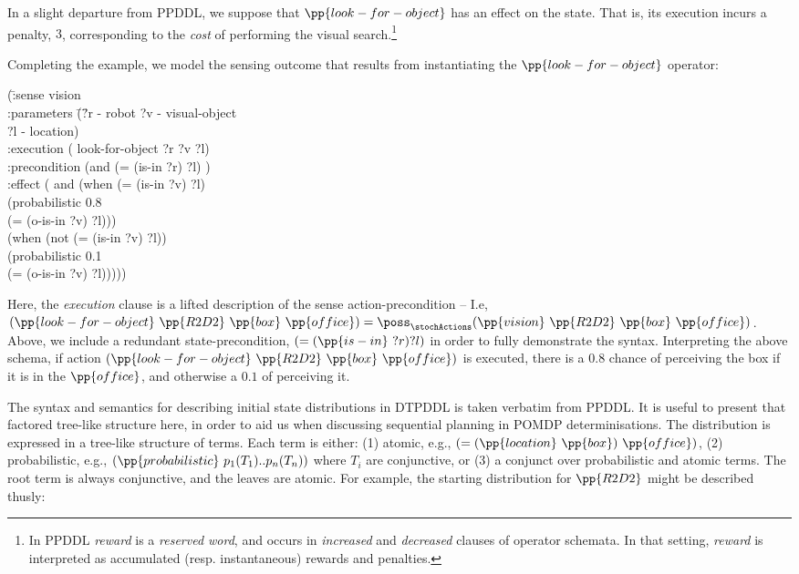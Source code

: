 \documentclass[letterpaper]{article}
\begin{document}
\noindent In a slight departure from PPDDL, we suppose that
$\pp{look-for-object}$ has an effect on the state. That is, its
execution incurs a penalty, $3$, corresponding to the {\em cost} of
performing the visual search.\footnote{In PPDDL {\em reward} is a {\em
reserved word}, and occurs in {\em increased} and {\em decreased}
clauses of operator schemata. In that setting, {\em reward} is
interpreted as accumulated (resp. instantaneous) rewards and
penalties.}

Completing the example, we model the sensing outcome that results from
instantiating the $\pp{look-for-object}$ operator:

\small
\begin{tabtt}
(\= :sense vision \+\\
 :parameters \= (\= ?r - robot ?v - visual-object\\
 \>\>  ?l - location) \\
 :execution \> ( \> look-for-object ?r ?v ?l) \\
 :precondition (and (= (is-in ?r) ?l) ) \\
 :effect \>  (  \> and (when (= (is-in ?v) ?l) \\
   \> \> (probabilistic 0.8 \\
   \>  \>(= (o-is-in ?v) ?l))) \\
  \> (when (not (= (is-in ?v) ?l)) \\
   \>  \> (probabilistic 0.1 \\
   \>  \> (= (o-is-in ?v) ?l))))) \\
\end{tabtt}
\normalsize


\noindent Here, the {\em execution} clause is a lifted description of
the sense action-precondition -- I.e,
$(\pp{look-for-object}~\pp{R2D2}~\pp{box}~\pp{office}) =
\poss_\stochActions(\pp{vision}~\pp{R2D2}~\pp{box}~\pp{office})$. Above,
we include a redundant state-precondition, $(=(\pp{is-in}~?r)?l)$ in
order to fully demonstrate the syntax. Interpreting the above schema,
if action $(\pp{look-for-object}~\pp{R2D2}~\pp{box}~\pp{office})$ is
executed, there is a $0.8$ chance of perceiving the box if it is in
the $\pp{office}$, and otherwise a $0.1$ of perceiving it.

The syntax and semantics for describing initial state distributions in
DTPDDL is taken verbatim from PPDDL. It is useful to present that
factored tree-like structure here, in order to aid us when discussing
sequential planning in POMDP determinisations. The distribution is
expressed in a tree-like structure of terms. Each term is either: (1)
atomic, e.g., $(=(\pp{location}~\pp{box})~\pp{office})$, (2)
probabilistic, e.g., $(\pp{probabilistic}~p_1 (T_1) .. p_n (T_n))$
where $T_i$ are conjunctive, or (3) a conjunct over probabilistic and
atomic terms. The root term is always conjunctive, and the leaves are
atomic. For example, the starting distribution for $\pp{R2D2}$ might
be described thusly:
\end{document}
